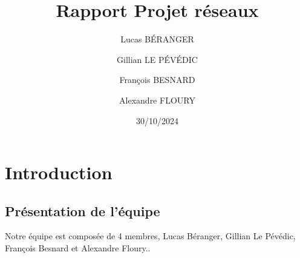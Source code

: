 \documentclass[a4paper,12pt]{report}
\title{Rapport Projet réseaux}
\author{
    Lucas BÉRANGER \and
    Gillian LE PÉVÉDIC \and
    François BESNARD \and
    Alexandre FLOURY \and
}
\date{30/10/2024}
\begin{document}
    \maketitle  
    \newpage

    \tableofcontents
    \newpage

    \chapter{Introduction}
        \section{Présentation de l'équipe}  
            Notre équipe est composée de 4 membres, Lucas Béranger, Gillian Le Pévédic, François Besnard et Alexandre Floury..
\end{document}
